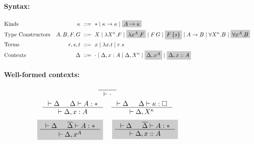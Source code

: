 \begin{figure}
\begin{framed}
\paragraph{Syntax:}
\begin{align*}
&\text{Kinds}
 	& \kappa		&~ ::= ~ *
				\mid \kappa -> \kappa
				\mid \newFi{A -> \kappa}
\\
&\text{Type Constructors}
	& A,B,F,G		&~ ::= ~ X
				\mid \lambda X^\kappa.F
				\mid \newFi{\lambda x^A.F}
				\mid F\,G
				\mid \newFi{F\,\{s\}}
				\mid A -> B
				\mid \forall X^\kappa . B
				\mid \newFi{\forall x^A . B}
\\
&\text{Terms}
	& r,s,t			&~ ::= ~ x \mid \lambda x.t \mid r\;s
\\
&\text{Contexts}
	& \Delta		&~ ::= ~ \cdot
				\mid \Delta, x : A
				\mid \Delta, X^\kappa
				\mid \newFi{\Delta, x^A}
				\mid \newFi{\Delta, x :: A}
\end{align*}

\begin{minipage}{.45\textwidth}
\paragraph{Well-formed contexts:}
\[ \inference{}{|- \cdot} \]
\[ \inference{|- \Delta & \Delta |- A:*}{|- \Delta,x:A}
 ~~~
   \inference{|- \Delta & \Delta |- \kappa:\square}{|- \Delta,X^\kappa}
\]
\[  \newFi{
   \inference{|- \Delta & \overline{\Delta} |- A:*}{|- \Delta,x^A} }
 ~~~~ \newFi{
   \inference{|- \Delta & \overline{\Delta} |- A:*}{|- \Delta,x::A} }
\]
\end{minipage} \qquad {}


\end{framed}
\end{figure}
